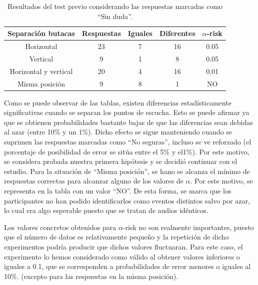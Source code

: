 \documentclass[11pt,a4paper]{book}
\begin{document}
		\begin{table}[H]
			\begin{center}
			\begin{scriptsize}
			\begin{tabular}{| c | c | c | c || c |}
			    \hline
				\textbf{Separación butacas}&\textbf{Respuestas}&\textbf{Iguales}&\textbf{Diferentes}&\textbf{$\alpha$-risk}\\ \hline
                Horizontal&23&7&16&0.05\\ \hline
                Vertical&9&1&8&0.05\\ \hline
                Horizontal y vertical&20&4&16&0.01\\ \hline
                Misma posición&9&8&1&NO\\ \hline
			\end{tabular}
			\caption{Resultados del test previo considerando las respuestas marcadas como ``Sin duda''.}
			\label{tablaResultadosSinDuda}
			\end{scriptsize}
			\end{center}	
		\end{table}
		
		Como se puede observar de las tablas, existen diferencias estadísticamente significativas cuando se separan los puntos de escucha. Esto se puede afirmar ya que se obtienen probabilidades bastante bajas de que las diferencias sean debidas al azar (entre 10\% y un 1\%). Dicho efecto se sigue manteniendo cuando se suprimen las respuestas marcadas como ``No seguras'', incluso se ve reforzado (el porcentaje de posibilidad de error se sitúa entre el 5\% y el1\%). Por este motivo, se considera probada nuestra primera hipótesis y se decidió continuar con el estudio. Para la situación de ``Misma posición'', se hano se alcanza el mínimo de respuestas correctas para alcanzar alguno de los valores de $\alpha$. Por este motivo, se representa en la tabla con un valor ``NO''. De esta forma, se marca que los participantes no han podido identificarlos como eventos distintos salvo por azar, lo cual era algo esperable puesto que se tratan de audios idénticos.
		
		Los valores concretos obtenidos para $\alpha$-risk no son realmente importantes, puesto que el número de datos es relativamente pequeño y la repetición de dicho experimentos podría producir que dichos valores fluctuaran. Para este caso, el experimento lo hemos considerado como válido al obtener valores inferiores o iguales a 0.1, que se corresponden a probabilidades de error menores o iguales al 10\%. (excepto para las respuestas en la misma posición).
		
\end{document}
